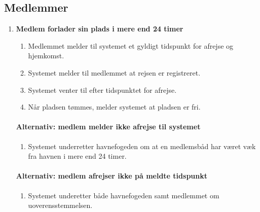 \subsection{Medlemmer}  
  \begin{enumerate}

    \item{\bf{Medlem forlader sin plads i mere end 24 timer}}
      \begin{enumerate}
        \item Medlemmet melder til systemet et gyldigt tidspunkt for afrejse og hjemkomst.
        \item Systemet melder til medlemmet at rejsen er registreret.
        \item Systemet venter til efter tidspunktet for afrejse.
        \item Når pladsen tømmes, melder systemet at pladsen er fri.
      \end{enumerate}

    \paragraph{Alternativ: medlem melder ikke afrejse til systemet}
      \begin{enumerate}
        \item Systemet underretter havnefogeden om at en medlemsbåd har været væk fra havnen i mere end 24 timer.
      \end{enumerate}


    \paragraph{Alternativ: medlem afrejser ikke på meldte tidspunkt}
      \begin{enumerate}
        \item Systemet underetter både havnefogeden samt medlemmet om uoverensstemmelsen.
      \end{enumerate}



\end{enumerate}
